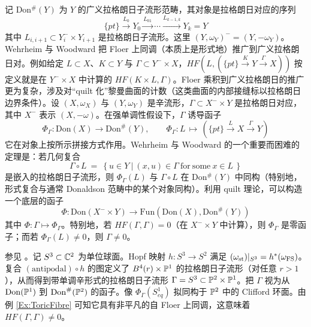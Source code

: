 记 Don$^{\#}(Y)$ 为 $Y$ 的广义拉格朗日子流形范畴，其对象是拉格朗日对应的序列
\[
\{pt\} \stackrel{L_0}{\longrightarrow} Y_0 \stackrel{L_{01}}{\longrightarrow} \cdots \stackrel{L_{k-1,k}}{\longrightarrow} Y_k = Y
\]
其中 $L_{i,i+1} \subset Y_i^- \times Y_{i+1}$ 是拉格朗日子流形。这里 $(Y,\omega_Y)^- = (Y, -\omega_Y)$。Wehrheim 与 Woodward \cite{WW1, WW2} 把 Floer 上同调（本质上是形式地）推广到广义拉格朗日对。例如给定 $L \subset X$、$K\subset Y$ 与 $\Gamma \subset Y^- \times X$，$HF(L, (\{pt\} \stackrel{K}{\longrightarrow} Y \stackrel{\Gamma}{\longrightarrow} X))$ 按定义就是在 $Y^- \times X$ 中计算的 $HF(K \times L, \Gamma)$。Floer 乘积到广义拉格朗日的推广更为复杂，涉及对“quilt 化”黎曼曲面的计数（这类曲面的内部接缝标以拉格朗日边界条件）。设 $(X,\omega_X)$ 与 $(Y,\omega_Y)$ 是辛流形，$\Gamma \subset X^-\times Y$ 是拉格朗日对应，其中 $X^-$ 表示 $(X,-\omega)$。在强单调性假设下，$\Gamma$ 诱导函子
\[
\Phi_{\Gamma}: \mathrm{Don}(X) \longrightarrow \mathrm{Don}^{\#}(Y),  \qquad  \Phi_{\Gamma}: L \, \mapsto \,  \left( \{pt\} \stackrel{L}{\longrightarrow} X \stackrel{\Gamma}{\longrightarrow} Y\right)
\]
它在对象上按所示拼接方式作用。Wehrheim 与 Woodward 的一个重要而困难的定理是：若几何复合
\[
\Gamma \circ L \ = \ \left\{ u \in Y \ \big| \ (x,u) \in \Gamma \ \mathrm{for \ some} \ x\in L\, \right\}
\]
是嵌入的拉格朗日子流形，则 $\Phi_{\Gamma}(L)$ 与 $\Gamma\circ L$ 在 Don$^{\#}(Y)$ 中同构（特别地，形式复合与通常 Donaldson 范畴中的某个对象同构）。利用 quilt 理论，可以构造一个底层的函子
\begin{equation} \label{Eqn:QuiltFunctor}
\Phi: \mathrm{Don}(X^- \times Y) \longrightarrow \mathrm{Fun}(\mathrm{Don}(X), \mathrm{Don}^{\#}(Y))
\end{equation}
其中 $\Phi: \Gamma \mapsto \Phi_{\Gamma}$。特别地，若 $HF(\Gamma,\Gamma) = 0$（在 $X^-\times Y$ 中计算），则 $\Phi_{\Gamma}$ 是零函子；而若 $\Phi_{\Gamma}(L) \neq 0$，则 $\Gamma \neq 0$。

\begin{Example} \label{Ex:Corr}
参见 \cite{WW2}。记 $S^3 \subset \mathbb{C}^2$ 为单位球面。Hopf 映射 $h: S^3 \rightarrow S^2$ 满足 $(\omega_{\operatorname{st}})|_{S^3} = h^*(\omega_{\operatorname{FS}})$。复合 $(\mathrm{antipodal})\circ h$ 的图定义了 $B^4(r) \times \mathbb{P}^1$ 的拉格朗日子流形（对任意 $r>1$），从而得到带单调辛形式的拉格朗日子流形 $\Gamma=S^3 \subset \mathbb{P}^2 \times \mathbb{P}^1$。把 $\Gamma$ 视为从 $\mathrm{Don}(\mathbb{P}^1)$ 到 $\mathrm{Don}^{\#}(\mathbb{P}^2)$ 的函子。像 $\Phi_{\Gamma}(S^1_{eq})$ 拟同构于 $\mathbb{P}^2$ 中的 Clifford 环面。由例 \ref{Ex:ToricFibre} 可知它具有非平凡的自 Floer 上同调，这意味着 $HF(\Gamma,\Gamma) \neq 0$。
\end{Example}

